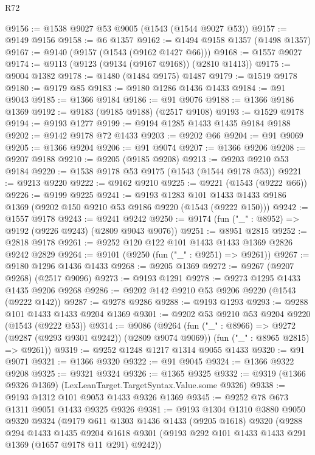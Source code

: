 \begin{lexlean}{R72}
\begin{coremodule}
@9156 := @1538 @9027 @53 @9005 (@1543 (@1544 @9027 @53))
@9157 := @9149 @9156
@9158 := @6 @1357
@9162 := @1494 @9158 @1357 (@1498 @1357)
@9167 := @9140 (@9157 (@1543 (@9162 @1427 @66)))
@9168 := @1557 @9027
@9174 := @9113 (@9123 (@9134 (@9167 @9168)) (@2810 @1413))
@9175 := @9004 @1382
@9178 := @1480 (@1484 @9175) @1487
@9179 := @1519 @9178
@9180 := @9179 @85
@9183 := @9180 @1286 @1436 @1433
@9184 := @91 @9043
@9185 := @1366 @9184
@9186 := @91 @9076
@9188 := @1366 @9186 @1369
@9192 := @9183 (@9185 @9188) (@2517 @9108)
@9193 := @1529 @9178
@9194 := @9193 @1277
@9199 := @9194 @1285 @1433 @1435 @9184 @9188
@9202 := @9142 @9178 @72 @1433
@9203 := @9202 @66
@9204 := @91 @9069
@9205 := @1366 @9204
@9206 := @91 @9074
@9207 := @1366 @9206
@9208 := @9207 @9188
@9210 := @9205 (@9185 @9208)
@9213 := @9203 @9210 @53 @9184
@9220 := @1538 @9178 @53 @9175 (@1543 (@1544 @9178 @53))
@9221 := @9213 @9220
@9222 := @9162 @9210
@9225 := @9221 (@1543 (@9222 @66))
@9226 := @9199 @9225
@9241 := @9193
    @1283
    @101
    @1433
    @1433
    @9186
    @1369
    (@9202 @150 @9210 @53 @9186 @9220 (@1543 (@9222 @150)))
@9242 := @1557 @9178
@9243 := @9241 @9242
@9250 := @9174 (fun ("_" : @8952) => @9192 (@9226 @9243) (@2809 @9043 @9076))
@9251 := @8951 @2815
@9252 := @2818 @9178
@9261 := @9252 @120 @122 @101 @1433 @1433 @1369 @2826 @9242 @2829
@9264 := @9101 (@9250 (fun ("_" : @9251) => @9261))
@9267 := @9180 @1296 @1436 @1433
@9268 := @9205 @1369
@9272 := @9267 (@9207 @9268) (@2517 @9096)
@9273 := @9193 @1291
@9278 := @9273 @1295 @1433 @1435 @9206 @9268
@9286 := @9202 @142 @9210 @53 @9206 @9220 (@1543 (@9222 @142))
@9287 := @9278 @9286
@9288 := @9193 @1293
@9293 := @9288 @101 @1433 @1433 @9204 @1369
@9301 := @9202 @53 @9210 @53 @9204 @9220 (@1543 (@9222 @53))
@9314 := @9086
    (@9264
      (fun ("_" : @8966) => @9272 (@9287 (@9293 @9301 @9242)) (@2809 @9074 @9069))
      (fun ("_" : @8965 @2815) => @9261))
@9319 := @9252 @1248 @1217 @1314 @9055 @1433
@9320 := @91 @9071
@9321 := @1366 @9320
@9322 := @91 @9045
@9324 := @1366 @9322 @9208
@9325 := @9321 @9324
@9326 := @1365 @9325
@9332 := @9319 (@1366 @9326 @1369) (LexLeanTarget.TargetSyntax.Value.some @9326)
@9338 := @9193 @1312 @101 @9053 @1433 @9326 @1369
@9345 := @9252 @78 @673 @1311 @9051 @1433 @9325 @9326
@9381 := @9193
    @1304
    @1310
    @3880
    @9050
    @9320
    @9324
    (@9179
      @611
      @1303
      @1436
      @1433
      (@9205 @1618)
      @9320
      (@9288
        @294
        @1433
        @1435
        @9204
        @1618
        @9301
        (@9193 @292 @101 @1433 @1433 @291 @1369 (@1657 @9178 @11 @291) @9242))

\end{coremodule}
\end{lexlean}
